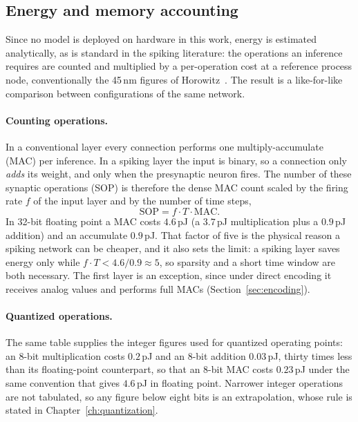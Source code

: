 \subsection{Energy and memory accounting}
\label{sec:energy-background}

Since no model is deployed on hardware in this work, energy is estimated
analytically, as is standard in the spiking literature: the operations an
inference requires are counted and multiplied by a per-operation cost at a
reference process node, conventionally the 45\,nm figures of
Horowitz~\cite{horowitz2014}. The result is a
like-for-like comparison between configurations of the same network.

\paragraph{Counting operations.} In a conventional layer every connection
performs one multiply-accumulate (MAC) per inference. In a spiking layer the
input is binary, so a connection only \emph{adds} its weight, and only when the
presynaptic neuron fires. The number of these synaptic operations (SOP) is
therefore the dense MAC count scaled by the firing rate $f$ of the input layer
and by the number of time steps,
\begin{equation}
\mathrm{SOP} = f \cdot T \cdot \mathrm{MAC}.
\end{equation}
In 32-bit floating point a MAC costs $4.6$\,pJ (a $3.7$\,pJ multiplication plus a
$0.9$\,pJ addition) and an accumulate $0.9$\,pJ. That factor of five is the
physical reason a spiking network can be cheaper, and it also sets the limit:
a spiking layer saves energy only while $f \cdot T < 4.6 / 0.9 \approx 5$, so
sparsity and a short time window are both necessary. The first layer is an
exception, since under direct encoding it receives analog values and performs
full MACs (Section~\ref{sec:encoding}).

\paragraph{Quantized operations.} The same table supplies the integer figures
used for quantized operating points: an 8-bit multiplication costs $0.2$\,pJ and
an 8-bit addition $0.03$\,pJ, thirty times less than its floating-point
counterpart, so that an 8-bit MAC costs $0.23$\,pJ under the same convention
that gives $4.6$\,pJ in floating point. Narrower integer operations are not tabulated, so any figure below
eight bits is an extrapolation, whose rule is stated in
Chapter~\ref{ch:quantization}.

